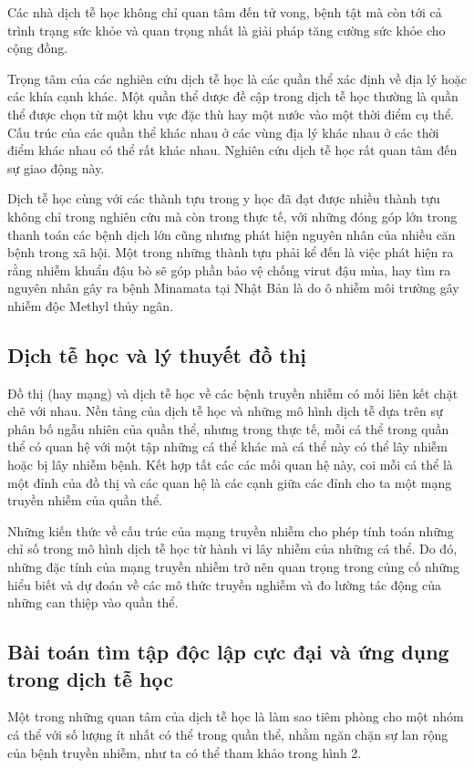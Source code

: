 \documentclass[14pt, oneside, a4paper, openany]{scrartcl}
\begin{document}
Các nhà dịch tễ học không chỉ quan tâm đến tử vong, bệnh tật mà còn tới cả trình trạng sức khỏe và quan trọng nhất là giải pháp tăng cường sức khỏe cho cộng đồng.

Trọng tâm của các nghiên cứu dịch tễ học là các quần thể xác định về địa lý hoặc các khía cạnh khác. Một quần thể dược đề cập trong dịch tễ học thường là quần thể được chọn từ một khu vực đặc thù hay một nước vào một thời điểm cụ thể. Cấu trúc của các quần thể khác nhau ở các vùng địa lý khác nhau ở các thời điểm khác nhau có thể rất khác nhau. Nghiên cứu dịch tễ học rất quan tâm đến sự giao động này.

Dịch tễ học cùng với các thành tựu trong y học đã đạt được nhiều thành tựu không chỉ trong nghiên cứu mà còn trong thực tế, với những đóng góp lớn trong thanh toán các bệnh dịch lớn cũng nhưng phát hiện nguyên nhân của nhiều căn bệnh trong xã hội. 
Một trong những thành tựu phải kể đến là việc phát hiện ra rằng nhiễm khuẩn đậu bò sẽ góp phần bảo vệ chống virut đậu mùa, hay tìm ra nguyên nhân gây ra bệnh Minamata tại Nhật Bản là do ô nhiễm môi trường gây nhiễm độc Methyl thủy ngân.

\subsection{Dịch tễ học và lý thuyết đồ thị}
Đồ thị (hay mạng) và dịch tễ học về các bệnh truyền nhiễm có mối liên kết chặt chẽ với nhau. Nền tảng của dịch tễ học và những mô hình dịch tễ dựa trên sự phân bố ngẫu nhiên của quần thể, nhưng trong thực tế, mỗi cá thể trong quần thể có quan hệ với một tập những cá thể khác mà cá thể này có thể lây nhiễm hoặc bị lây nhiễm bệnh. Kết hợp tất các các mối quan hệ này, coi mỗi cá thể là một đỉnh của đồ thị và các quan hệ là các cạnh giữa các đỉnh cho ta một mạng truyền nhiễm của quần thể.

Những kiến thức về cấu trúc của mạng truyền nhiễm cho phép tính toán những chỉ số trong mô hình dịch tễ học từ hành vi lây nhiễm của những cá thể. Do đó, những đặc tính của mạng truyền nhiễm trở nên quan trọng trong củng cố những hiểu biết và dự đoán về các mô thức truyền nghiễm và đo lường tác động của những can thiệp vào quần thể.

\subsection{Bài toán tìm tập độc lập cực đại và ứng dụng trong dịch tễ học}

Một trong những quan tâm của dịch tễ học là làm sao tiêm phòng cho một nhóm cá thể với số lượng ít nhất có thể trong quần thể, nhằm ngăn chặn sự lan rộng của bệnh truyền nhiễm, như ta có thể tham khảo trong hình 2.
\end{document}
